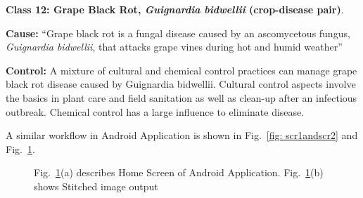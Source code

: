 \textbf{Class 12: Grape Black Rot, \textit{Guignardia bidwellii} (crop-disease pair)}.

\textbf{Cause:} “Grape black rot is a fungal disease caused by an ascomycetous fungus, \textit{Guignardia bidwellii}, that attacks grape vines during hot and humid weather”

\textbf{Control:} A mixture of cultural and chemical control practices can manage grape black rot disease caused by Guignardia bidwellii. Cultural control aspects involve the basics in plant care and field sanitation as well as clean-up after an infectious outbreak. Chemical control has a large influence to eliminate disease.

A similar workflow in Android Application is shown in Fig.~\ref{fig: scr1andscr2} and Fig.~\ref{fig: scr3andscr4}.

\begin{figure}[!h]
	\hfill
	\hfill
	\hfill
	\caption{\label{fig: scr3andscr4}Fig.~\ref{fig: scr3andscr4}(a) describes Home Screen of Android Application. Fig.~\ref{fig: scr3andscr4}(b) shows Stitched image output}
\end{figure}


